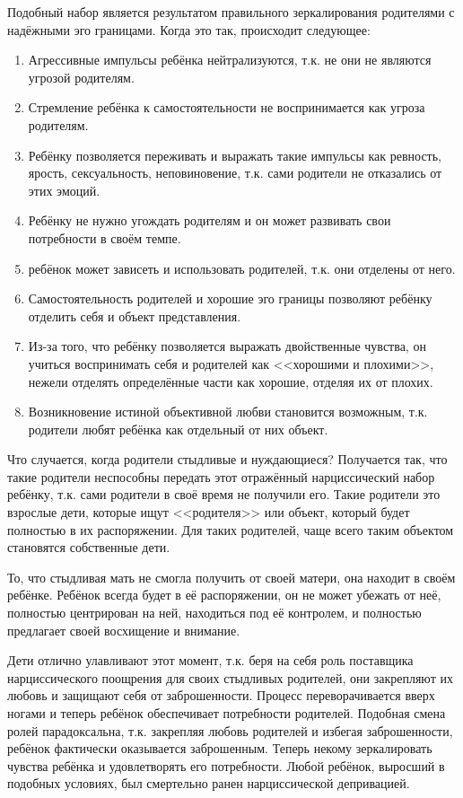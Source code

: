 \documentclass[10pt, fleqn]{article}
\begin{document}
Подобный набор является результатом правильного зеркалирования родителями с надёжными эго границами. Когда это так, происходит следующее:
\begin{enumerate}
\item Агрессивные импульсы ребёнка нейтрализуются, т.к. не они не являются угрозой родителям.
\item Стремление ребёнка к самостоятельности не воспринимается как угроза родителям.
\item Ребёнку позволяется переживать и выражать такие импульсы как ревность, ярость, сексуальность, неповиновение, т.к. сами родители не отказались от этих эмоций.
\item Ребёнку не нужно угождать родителям и он может развивать свои потребности в своём темпе.
\item ребёнок может зависеть и использовать родителей, т.к. они отделены от него.
\item Самостоятельность родителей и хорошие эго границы позволяют ребёнку отделить себя и объект представления.
\item Из-за того, что ребёнку позволяется выражать двойственные чувства, он учиться воспринимать себя и родителей как <<хорошими и плохими>>, нежели отделять определённые части как хорошие, отделяя их от плохих.
\item Возникновение истиной объективной любви становится возможным, т.к. родители любят ребёнка как отдельный от них объект. 
\end{enumerate}

Что случается, когда родители стыдливые и нуждающиеся? Получается так, что такие родители неспособны передать этот отражённый нарциссический набор ребёнку, т.к. сами родители в своё время не получили его. Такие родители это взрослые дети, которые ищут <<родителя>> или объект, который будет полностью в их распоряжении. Для таких родителей, чаще всего таким объектом становятся собственные дети.

То, что стыдливая мать не смогла получить от своей матери, она находит в своём ребёнке. Ребёнок всегда будет в её распоряжении, он не может убежать от неё, полностью центрирован на ней, находиться под её контролем, и полностью предлагает своей восхищение и внимание.

Дети отлично улавливают этот момент, т.к. беря на себя роль поставщика нарциссического поощрения для своих стыдливых родителей, они закрепляют их любовь и защищают себя от заброшенности. Процесс переворачивается вверх ногами и теперь ребёнок обеспечивает потребности родителей. Подобная смена ролей парадоксальна, т.к. закрепляя любовь родителей и избегая заброшенности, ребёнок фактически оказывается заброшенным. Теперь некому зеркалировать чувства ребёнка и удовлетворять его потребности. Любой ребёнок, выросший в подобных условиях, был смертельно ранен нарциссической депривацией.
\end{document}
